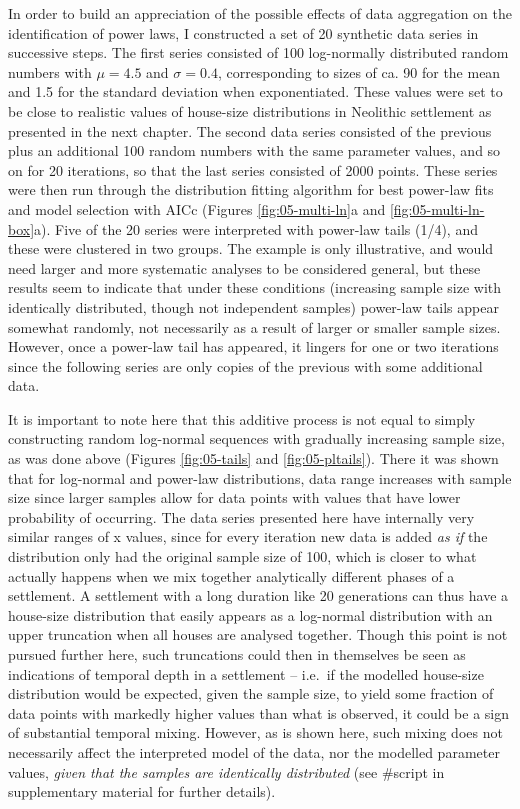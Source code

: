 \documentclass[
  12pt,
  a4paper, twoside]{book}
\begin{document}
In order to build an appreciation of the possible effects of data aggregation on the identification of power laws, I constructed a set of 20 synthetic data series in successive steps. The first series consisted of 100 log-normally distributed random numbers with \(\mu = 4.5\) and \(\sigma = 0.4\), corresponding to sizes of ca. 90 for the mean and 1.5 for the standard deviation when exponentiated. These values were set to be close to realistic values of house-size distributions in Neolithic settlement as presented in the next chapter. The second data series consisted of the previous plus an additional 100 random numbers with the same parameter values, and so on for 20 iterations, so that the last series consisted of 2000 points. These series were then run through the distribution fitting algorithm for best power-law fits and model selection with AICc (Figures \ref{fig:05-multi-ln}a and \ref{fig:05-multi-ln-box}a). Five of the 20 series were interpreted with power-law tails (1/4), and these were clustered in two groups. The example is only illustrative, and would need larger and more systematic analyses to be considered general, but these results seem to indicate that under these conditions (increasing sample size with identically distributed, though not independent samples) power-law tails appear somewhat randomly, not necessarily as a result of larger or smaller sample sizes. However, once a power-law tail has appeared, it lingers for one or two iterations since the following series are only copies of the previous with some additional data.

It is important to note here that this additive process is not equal to simply constructing random log-normal sequences with gradually increasing sample size, as was done above (Figures \ref{fig:05-tails} and \ref{fig:05-pltails}). There it was shown that for log-normal and power-law distributions, data range increases with sample size since larger samples allow for data points with values that have lower probability of occurring. The data series presented here have internally very similar ranges of x values, since for every iteration new data is added \emph{as if} the distribution only had the original sample size of 100, which is closer to what actually happens when we mix together analytically different phases of a settlement. A settlement with a long duration like 20 generations can thus have a house-size distribution that easily appears as a log-normal distribution with an upper truncation when all houses are analysed together. Though this point is not pursued further here, such truncations could then in themselves be seen as indications of temporal depth in a settlement -- i.e.~if the modelled house-size distribution would be expected, given the sample size, to yield some fraction of data points with markedly higher values than what is observed, it could be a sign of substantial temporal mixing. However, as is shown here, such mixing does not necessarily affect the interpreted model of the data, nor the modelled parameter values, \emph{given that the samples are identically distributed} (see \#script in supplementary material for further details).
\end{document}

